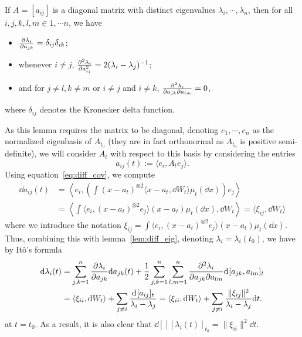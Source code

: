 \begin{lemma}\label{lem:diff_eig}
  If \(A = [a_{ij}]\) is a diagonal matrix with distinct eigenvalues \(\lambda_i, \cdots, \lambda_n\), then 
  for all \(i, j, k, l, m \in {1, \cdots n}\), we have
  \begin{itemize}
    \item \(\pdv{\lambda_i}{a_{jk}} = \delta_{ij} \delta_{ik}\);
    \item whenever \(i \neq j\), \(\pdv[2]{\lambda_i}{a_{ij}} = 2(\lambda_i - \lambda_j)^{-1}\);
    \item and for \(j \neq l, k \neq m\) or \(i \neq j\) and \(i \neq k\),
      \(\pdv[2]{\lambda_i}{a_{jk}}{a_{lm}} = 0\),
  \end{itemize}
  where \(\delta_{ij}\) denotes the Kronecker delta function.
\end{lemma}

As this lemma requires the matrix to be diagonal, denoting \(e_1, \cdots, e_n\) as the normalized 
eigenbasis of \(A_{t_0}\) (they are in fact orthonormal as \(A_{t_0}\) is positive semi-definite), 
we will consider \(A_t\) with respect to this basis by considering the entries 
\[a_{ij}(t) := \langle e_i, A_t e_j\rangle.\]
Using equation~\eqref{eq:diff_cov}, we compute 
\begin{align*}
  \dd a_{ij}(t) & = \left\langle e_i, \left(\int (x - a_t)^{\otimes 2} 
    \langle x - a_t, \dd W_t \rangle \mu_t(\dd x)\right) e_j \right\rangle\\
    & = \left\langle\int \langle e_i, (x - a_t)^{\otimes 2} e_j\rangle
      (x - a_t) \mu_t(\dd x), \dd W_t\right\rangle
      = \langle \xi_{ij}, \dd W_t\rangle
\end{align*}
where we introduce the notation \(\xi_{ij} = \int \langle e_i, (x - a_t)^{\otimes 2} e_j\rangle (x - a_t) \mu_t(\dd x).\)
Thus, combining this with lemma~\ref{lem:diff_eig}, 
denoting \(\lambda_i = \lambda_i(t_0)\), we have by Itô's formula
\begin{equation}
  \begin{split}
    \dd \lambda_i(t) 
    & = \sum_{j, k = 1}^n \pdv{\lambda_i}{a_{jk}} \dd a_{jk}(t) 
      + \frac{1}{2}\sum_{j, k = 1}^n \sum_{l, m = 1}^n \pdv[2]{\lambda_i}{a_{jk}}{a_{lm}} \dd[] [a_{jk}, a_{lm}]_t\\
    & = \langle \xi_{ii}, \dd W_t\rangle + \sum_{j \neq i} \frac{\dd[][a_{ij}]_t}{\lambda_i - \lambda_j}
      = \langle \xi_{ii}, \dd W_t\rangle + \sum_{j \neq i} \frac{\|\xi_{ij}\|^2}{\lambda_i - \lambda_{j}} \dd t.
  \end{split}
\end{equation}
at \(t = t_0\). As a result, it is also clear that \(\dd[][\lambda_i(t)]_{t_0} = \|\xi_{ii}\|^2 \dd t\). 

